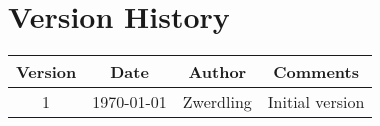 \section{Version History}
\begin{adjustbox}{width=\textwidth}
  \begin{tabular}{ |c|c|c|c| }
    \hline
    Version & Date   & Author      & Comments          \\
    \hline
    \hline
    1       & \today & {Zwerdling} & {Initial version} \\
    \hline
  \end{tabular}
\end{adjustbox}